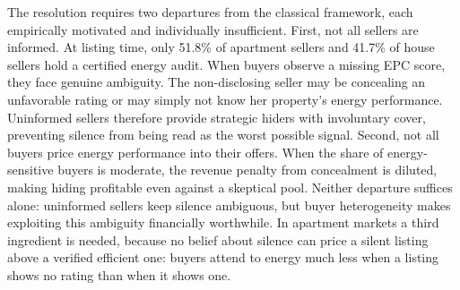 The resolution requires two departures from the classical framework, each empirically motivated and individually insufficient. First, not all sellers are informed. At listing time, only 51.8\% of apartment sellers and 41.7\% of house sellers hold a certified energy audit. When buyers observe a missing EPC score, they face genuine ambiguity. The non-disclosing seller may be concealing an unfavorable rating or may simply not know her property's energy performance. Uninformed sellers therefore provide strategic hiders with involuntary cover, preventing silence from being read as the worst possible signal. Second, not all buyers price energy performance into their offers. When the share of energy-sensitive buyers is moderate, the revenue penalty from concealment is diluted, making hiding profitable even against a skeptical pool. Neither departure suffices alone: uninformed sellers keep silence ambiguous, but buyer heterogeneity makes exploiting this ambiguity financially worthwhile. In apartment markets a third ingredient is needed, because no belief about silence can price a silent listing above a verified efficient one: buyers attend to energy much less when a listing shows no rating than when it shows one. %
